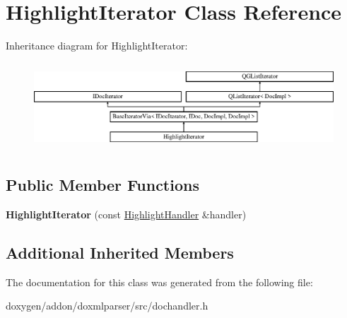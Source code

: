 \hypertarget{class_highlight_iterator}{}\section{Highlight\+Iterator Class Reference}
\label{class_highlight_iterator}
Inheritance diagram for Highlight\+Iterator\+:\begin{figure}[H]
\begin{center}
\leavevmode
\includegraphics[height=3.294118cm]{class_highlight_iterator}
\end{center}
\end{figure}
\subsection*{Public Member Functions}
\begin{DoxyCompactItemize}
\item 
\mbox{\label{class_highlight_iterator_a7d6dfc153e8e5a78fa1e56b0f3fe06a3}} 
{\bfseries Highlight\+Iterator} (const \mbox{\hyperlink{class_highlight_handler}{Highlight\+Handler}} \&handler)
\end{DoxyCompactItemize}
\subsection*{Additional Inherited Members}


The documentation for this class was generated from the following file\+:\begin{DoxyCompactItemize}
\item 
doxygen/addon/doxmlparser/src/dochandler.\+h\end{DoxyCompactItemize}
